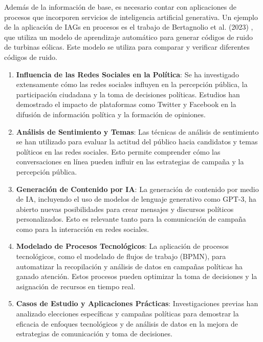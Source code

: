 \documentclass[12pt]{article}
\begin{document}
Además de la información de base, es necesario contar con aplicaciones de procesos que incorporen servicios de inteligencia artificial generativa. Un ejemplo de la aplicación de IAGs en procesos es el trabajo de Bertagnolio et al. (2023) \cite{bertagnolio2023}, que utiliza un modelo de aprendizaje automático para generar códigos de ruido de turbinas eólicas. Este modelo se utiliza para comparar y verificar diferentes códigos de ruido.


\begin{enumerate}
\item \textbf{Influencia de las Redes Sociales en la Política}: Se ha investigado extensamente cómo las redes sociales influyen en la percepción pública, la participación ciudadana y la toma de decisiones políticas. Estudios han demostrado el impacto de plataformas como Twitter y Facebook en la difusión de información política y la formación de opiniones.

\item \textbf{Análisis de Sentimiento y Temas}: Las técnicas de análisis de sentimiento se han utilizado para evaluar la actitud del público hacia candidatos y temas políticos en las redes sociales. Esto permite comprender cómo las conversaciones en línea pueden influir en las estrategias de campaña y la percepción pública.

\item \textbf{Generación de Contenido por IA}: La generación de contenido por medio de IA, incluyendo el uso de modelos de lenguaje generativo como GPT-3, ha abierto nuevas posibilidades para crear mensajes y discursos políticos personalizados. Esto es relevante tanto para la comunicación de campaña como para la interacción en redes sociales.

\item \textbf{Modelado de Procesos Tecnológicos}: La aplicación de procesos tecnológicos, como el modelado de flujos de trabajo (BPMN), para automatizar la recopilación y análisis de datos en campañas políticas ha ganado atención. Estos procesos pueden optimizar la toma de decisiones y la asignación de recursos en tiempo real.

\item \textbf{Casos de Estudio y Aplicaciones Prácticas}: Investigaciones previas han analizado elecciones específicas y campañas políticas para demostrar la eficacia de enfoques tecnológicos y de análisis de datos en la mejora de estrategias de comunicación y toma de decisiones.
\end{enumerate}
\end{document}
